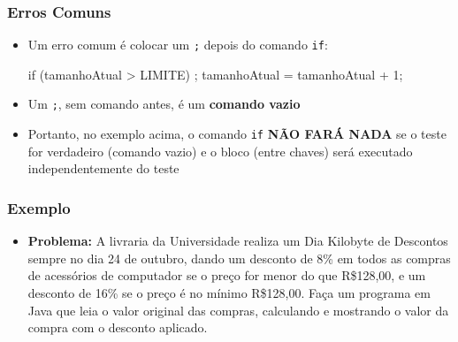 \documentclass[xcolor={dvipsnames,table},aspectratio=169]{beamer}
\begin{document}
\begin{frame}[fragile]\frametitle{Erros Comuns}
\begin{itemize}
	\item Um erro comum é colocar um \texttt{;} depois do comando \texttt{if}:
\begin{javacode}
if (tamanhoAtual > LIMITE) ;
{
   tamanhoAtual = tamanhoAtual + 1;
}
\end{javacode}
	\item Um \texttt{;}, sem comando antes, é um \textbf{comando vazio}
	\item Portanto, no exemplo acima, o comando \texttt{if} \textbf{NÃO FARÁ NADA} se o teste for verdadeiro (comando vazio) e o bloco (entre chaves) será executado independentemente do teste
\end{itemize}	
\end{frame}

\begin{frame}\frametitle{Exemplo}
\begin{itemize}
\item \textbf{Problema:} A livraria da Universidade realiza um Dia Kilobyte de Descontos sempre no dia 24 de outubro, dando um desconto de 8\% em todos as compras de acessórios de computador se o preço for menor do que R\$128,00, e um desconto de 16\% se o preço é no mínimo R\$128,00. Faça um programa em Java que leia o valor original das compras, calculando e mostrando o valor da compra com o desconto aplicado.
\end{itemize}
\end{frame}
\end{document}
